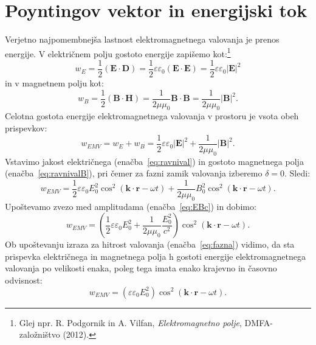\section{Poyntingov vektor in energijski tok}
Verjetno najpomembnejša lastnost elektromagnetnega valovanja je prenos energije. V električnem
polju gostoto energije zapišemo kot:\footnote{Glej npr. R. Podgornik in A. Vilfan, {\it Elektromagnetno polje}, 
DMFA-založništvo (2012).}
\begin{equation}
w_E = \frac{1}{2} \left(\mathbf{E}\cdot \mathbf{D}\right) = 
\frac{1}{2} \varepsilon \varepsilon_0 \left(\mathbf{E}\cdot \mathbf{E}\right)
= \frac{1}{2}\varepsilon \varepsilon_0 |\mathbf{E}|^2
\label{eq:03_27}
\end{equation}
in v magnetnem polju kot: 
\begin{equation}
w_B = \frac{1}{2} \left(\mathbf{B}\cdot \mathbf{H}\right) = 
\frac{1}{2\mu \mu_0} \mathbf{B}\cdot \mathbf{B} = 
\frac{1}{2\mu \mu_0} |\mathbf{B}|^2.
\label{eq:03_28}
\end{equation}
Celotna gostota energije elektromagnetnega valovanja v prostoru je vsota obeh prispevkov:
\begin{equation}
w_{EMV} = w_E + w_B = \frac{1}{2}\varepsilon \varepsilon_0 |\mathbf{E}|^2 + \frac{1}{2\mu \mu_0} |\mathbf{B}|^2.
\label{eq:03_29}
\end{equation}
Vstavimo jakost električnega (enačba~\ref{eq:ravnival}) in gostoto magnetnega polja
(enačba~\ref{eq:ravnivalB}), pri čemer za fazni zamik valovanja izberemo $\delta=0$. Sledi:
\begin{equation}
w_{EMV} = \frac{1}{2}\varepsilon \varepsilon_0 E_0^2 
\cos^2 \left(\mathbf{k}\cdot \mathbf{r} - \omega t\right)
+ \frac{1}{2\mu \mu_0} B_0^2 \cos^2 \left(\mathbf{k}\cdot \mathbf{r} - \omega t\right)\!.
\label{eq:03_30}
\end{equation}
Upoštevamo zvezo med amplitudama (enačba~\ref{eq:EBc}) in dobimo:
\begin{equation}
w_{EMV} = \left(\frac{1}{2}\varepsilon \varepsilon_0 E_0^2 + 
\frac{1}{2\mu \mu_0} \frac{E_0^2}{c^2} \right) 
\cos^2 \left(\mathbf{k}\cdot \mathbf{r} - \omega t\right)\!.
\label{eq:03_31}
\end{equation}
Ob upoštevanju izraza za hitrost valovanja (enačba~\ref{eq:fazna}) vidimo,
da sta prispevka električnega in magnetnega polja h gostoti energije elektromagnetnega valovanja
po velikosti enaka, poleg tega imata enako krajevno in časovno odvisnost:
\begin{equation}
w_{EMV} = \left(\varepsilon \varepsilon_0 E_0^2  \right) 
\cos^2 \left(\mathbf{k}\cdot \mathbf{r} - \omega t\right)\!.
\label{eq:03_32}
\end{equation}
